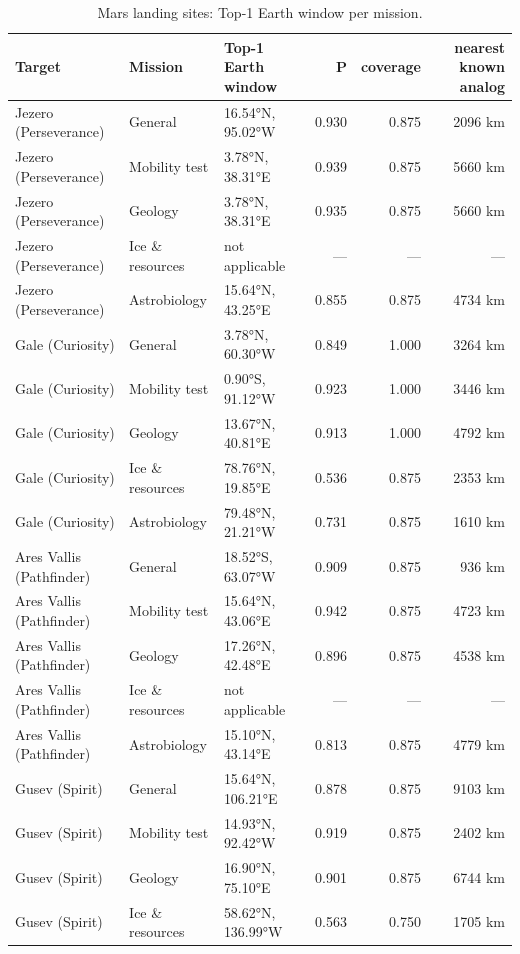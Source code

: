 \begin{table}[ht]
\centering\small
\caption{Mars landing sites: Top-1 Earth window per mission.}
\label{tab:mars}
\begin{tabular}{lllrrr}
\hline
Target & Mission & Top-1 Earth window & P & coverage & nearest known analog \\
\hline
Jezero (Perseverance) & General & 16.54°N, 95.02°W & 0.930 & 0.875 & 2096 km \\
Jezero (Perseverance) & Mobility test & 3.78°N, 38.31°E & 0.939 & 0.875 & 5660 km \\
Jezero (Perseverance) & Geology & 3.78°N, 38.31°E & 0.935 & 0.875 & 5660 km \\
Jezero (Perseverance) & Ice \& resources & not applicable & — & — & — \\
Jezero (Perseverance) & Astrobiology & 15.64°N, 43.25°E & 0.855 & 0.875 & 4734 km \\
Gale (Curiosity) & General & 3.78°N, 60.30°W & 0.849 & 1.000 & 3264 km \\
Gale (Curiosity) & Mobility test & 0.90°S, 91.12°W & 0.923 & 1.000 & 3446 km \\
Gale (Curiosity) & Geology & 13.67°N, 40.81°E & 0.913 & 1.000 & 4792 km \\
Gale (Curiosity) & Ice \& resources & 78.76°N, 19.85°E & 0.536 & 0.875 & 2353 km \\
Gale (Curiosity) & Astrobiology & 79.48°N, 21.21°W & 0.731 & 0.875 & 1610 km \\
Ares Vallis (Pathfinder) & General & 18.52°S, 63.07°W & 0.909 & 0.875 & 936 km \\
Ares Vallis (Pathfinder) & Mobility test & 15.64°N, 43.06°E & 0.942 & 0.875 & 4723 km \\
Ares Vallis (Pathfinder) & Geology & 17.26°N, 42.48°E & 0.896 & 0.875 & 4538 km \\
Ares Vallis (Pathfinder) & Ice \& resources & not applicable & — & — & — \\
Ares Vallis (Pathfinder) & Astrobiology & 15.10°N, 43.14°E & 0.813 & 0.875 & 4779 km \\
Gusev (Spirit) & General & 15.64°N, 106.21°E & 0.878 & 0.875 & 9103 km \\
Gusev (Spirit) & Mobility test & 14.93°N, 92.42°W & 0.919 & 0.875 & 2402 km \\
Gusev (Spirit) & Geology & 16.90°N, 75.10°E & 0.901 & 0.875 & 6744 km \\
Gusev (Spirit) & Ice \& resources & 58.62°N, 136.99°W & 0.563 & 0.750 & 1705 km \\

\end{tabular}
\end{table}
